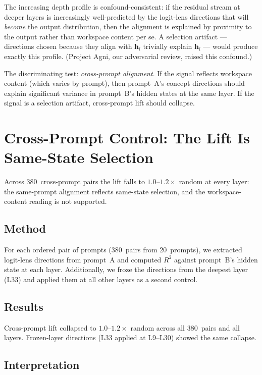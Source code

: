 \documentclass[11pt,a4paper]{article}
\begin{document}
The increasing depth profile is confound-consistent: if the residual
stream at deeper layers is increasingly well-predicted by the logit-lens
directions that will \emph{become} the output distribution, then the
alignment is explained by proximity to the output rather than workspace
content per se. A selection artifact --- directions chosen because they
align with $\mathbf{h}_l$ trivially explain $\mathbf{h}_l$ --- would
produce exactly this profile. (Project Agni, our adversarial review,
raised this confound.)

The discriminating test: \emph{cross-prompt alignment}. If the signal
reflects workspace content (which varies by prompt), then prompt~A's
concept directions should explain significant variance in prompt~B's
hidden states at the same layer. If the signal is a selection artifact,
cross-prompt lift should collapse.

\section{Cross-Prompt Control: The Lift Is Same-State Selection}
\label{sec:crossprompt}

Across 380~cross-prompt pairs the lift falls to $1.0$--$1.2\times$
random at every layer: the same-prompt alignment reflects same-state
selection, and the workspace-content reading is not supported.

\subsection{Method}

For each ordered pair of prompts (380~pairs from 20~prompts), we
extracted logit-lens directions from prompt~A and computed $R^2$
against prompt~B's hidden state at each layer. Additionally, we
froze the directions from the deepest layer (L33) and applied them
at all other layers as a second control.

\subsection{Results}

Cross-prompt lift collapsed to $1.0$--$1.2\times$ random across all
380~pairs and all layers. Frozen-layer
directions (L33 applied at L9--L30) showed the same collapse.

\subsection{Interpretation}
\end{document}
